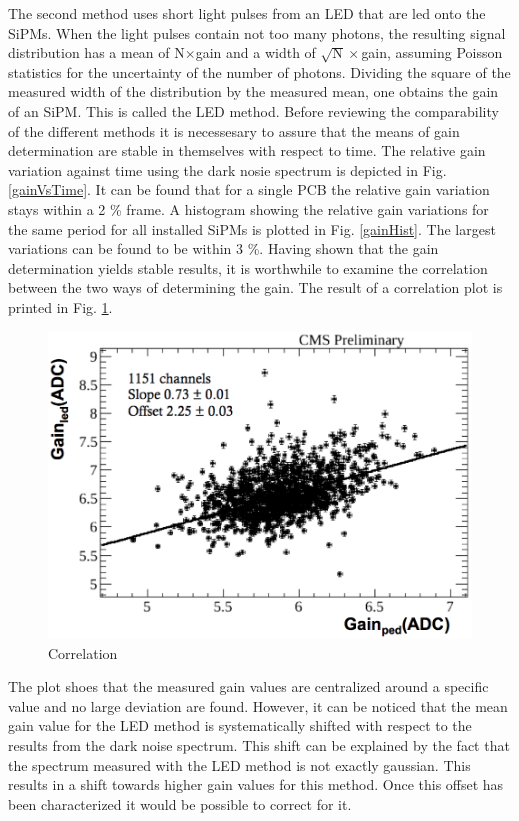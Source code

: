 The second method uses short light pulses from an LED that are led onto the SiPMs. When the light pulses contain not too many photons, the resulting signal distribution has a mean of N$\times$gain and a width of $\sqrt{\text{N}}\times$gain, assuming Poisson statistics for the uncertainty of the number of photons. Dividing the square of the measured width of the distribution by the measured mean, one obtains the gain of an SiPM. This is called the LED method.
Before reviewing the comparability of the different methods it is necessesary to assure that the means of gain determination are stable in themselves with respect to time. The relative gain variation against time using the dark nosie spectrum is depicted in Fig. \ref{gainVsTime}. It can be found that for a single PCB the relative gain variation stays within a 2 \% frame. A histogram showing the relative gain variations for the same period for all installed SiPMs is plotted in Fig. \ref{gainHist}. The largest variations can be found to be within 3 \%. Having shown that the gain determination yields stable results, it is worthwhile to examine the correlation between the two ways of determining the gain. The result of a correlation plot is printed in Fig. \ref{gainCorr}.
\begin{figure}
\centering
\begin{minipage}[t]{0.475\textwidth}
\includegraphics[width=\textwidth]{Figures/kuensken/gainCorrelation.png}
\end{minipage}
\hspace{0.5cm}
\begin{minipage}[t]{0.475\textwidth}
\caption{Correlation}
\label{gainCorr}
\end{minipage}
\end{figure}
The plot shoes that the measured gain values are centralized around a specific value and no large deviation are found. However, it can be noticed that the mean gain value for the LED method is systematically shifted with respect to the results from the dark noise spectrum. This shift can be explained by the fact that the spectrum measured with the LED method is not exactly gaussian. This results in a shift towards higher gain values for this method. Once this offset has been characterized it would be possible to correct for it.

